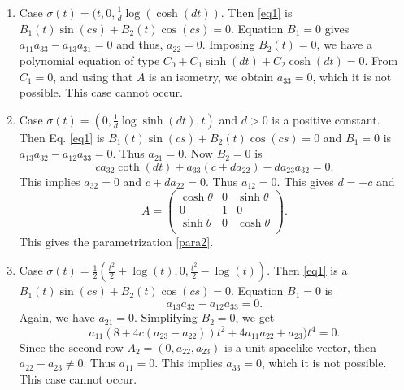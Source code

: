 \documentclass[a4paper,12pt]{amsart}
\numberwithin{equation}{section}
\theoremstyle{definition}
\begin{document}
\begin{enumerate}
\begin{enumerate}
 \item Case   $\sigma(t)=(t,0,\frac{1}{d}\log(\cosh (dt))$.  Then \eqref{eq1} is    $B_1(t)\sin(cs)+B_2(t)\cos(cs)=0$. Equation $B_1=0$ gives $a_{11}a_{33}-a_{13}a_{31}=0$ and thus, $a_{22}=0$. Imposing $B_2(t)=0$, we have a polynomial equation of type $C_0+C_1 \sinh(dt)+C_2\cosh(dt)=0$. From  $C_1=0$, and using that $A$ is an isometry, we obtain   $a_{33}=0$, which it is not possible. This  case cannot occur.
 \item Case   $\sigma(t)=(0, \frac{1}{d}\log\sinh(dt),t)$ and $d>0$ is a positive constant.  Then Eq. \eqref{eq1} is  $B_1(t)\sin(cs)+B_2(t)\cos(cs)=0$ and $B_1=0$ is $a_{13} a_{32}-a_{12} a_{33}=0$. Thus $a_{21}=0$. Now $B_2=0$ is
 $$ ca_{32}\coth(dt)+a_{33}(c+da_{22})-d a_{23}a_{32}=0.$$
 This implies $a_{32}=0$  and $c+da_{22}=0$. Thus $a_{12}=0$. This gives $d=-c$ and 
 $$A=\left(
\begin{array}{ccc}
 \cosh \theta & 0 & \sinh \theta  \\
 0 & 1 & 0 \\
 \sinh \theta  & 0 & \cosh \theta  \\
\end{array}
\right).$$
  This gives the parametrization \eqref{para2}.


\item Case  $\sigma(t)=\frac{1}{2}\left(\frac{t^2}{2}+\log(t),0, \frac{t^2}{2}-\log(t)\right)$. Then \eqref{eq1} is   a $B_1(t)\sin(cs)+B_2(t)\cos(cs)=0$. Equation $B_1=0$ is
$$a_{13} a_{32}-a_{12} a_{33}=0.$$
Again, we have   $a_{21}=0$. Simplifying $B_2=0$, we get 
$$a_{11}(8+4c(a_{23}-a_{22}))t^2+4a_{11}a_{22}+a_{23})t^4=0.$$
Since the second row $A_2=(0,a_{22},a_{23})$ is a unit spacelike vector, then $a_{22}+a_{23}\not=0$. Thus $a_{11}=0$. This implies $a_{33}=0$, which it is not possible. This case cannot occur. 
\end{enumerate}
  

\end{enumerate}



\end{document}
